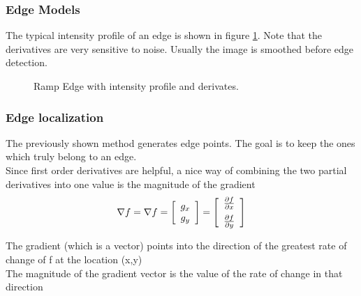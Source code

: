 \subsubsection{Edge Models}

The typical intensity profile of an edge is shown in figure \ref{fig:imseg_edgemodels}.
Note that the derivatives are very sensitive to noise. Usually the image is smoothed before
edge detection.

\begin{figure}[!h]
	\centering
	
	\caption{Ramp Edge with intensity profile and derivates.}
	\label{fig:imseg_edgemodels}
\end{figure}

\subsubsection{Edge localization}
The previously shown method generates edge points. The goal is to keep the ones which truly belong to an edge.\\
Since first order derivatives are helpful, a nice way of combining the two partial derivatives into one value is the magnitude of the gradient
\begin{equation}
	\nabla f = \nabla f = \left[\begin{array}{c} g_x \\ g_y \end{array}\right] =  \left[\displaystyle{\begin{array}{c} \frac{\partial f}{\partial x} \vspace{0.2cm}  \\ \frac{\partial f}{\partial y} \end{array}}\right] \notag
\end{equation}

The gradient (which is a vector) points into the direction of the greatest rate of change of f at the location (x,y)\\
The magnitude of the gradient vector is the value of the rate of change in that direction \\

